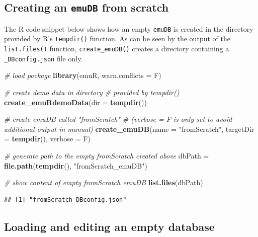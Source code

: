 \documentclass[]{book}
\newenvironment{Shaded}{\begin{snugshade}}{\end{snugshade}}
\newcommand{\CommentTok}[1]{\textcolor[rgb]{0.56,0.35,0.01}{\textit{#1}}}
\newcommand{\DataTypeTok}[1]{\textcolor[rgb]{0.13,0.29,0.53}{#1}}
\newcommand{\KeywordTok}[1]{\textcolor[rgb]{0.13,0.29,0.53}{\textbf{#1}}}
\newcommand{\NormalTok}[1]{#1}
\newcommand{\StringTok}[1]{\textcolor[rgb]{0.31,0.60,0.02}{#1}}
\begin{document}
\hypertarget{creating-an-emudb-from-scratch}{%
\subsection{\texorpdfstring{Creating an \texttt{emuDB} from scratch}{Creating an emuDB from scratch}}\label{creating-an-emudb-from-scratch}}

The R code snippet below shows how an empty \texttt{emuDB} is created in the directory provided by R's \texttt{tempdir()} function. As can be seen by the output of the \texttt{list.files()} function, \texttt{create\_emuDB()} creates a directory containing a \texttt{\_DBconfig.json} file only.

\begin{Shaded}
\begin{Highlighting}[]
\CommentTok{# load package}
\KeywordTok{library}\NormalTok{(emuR, }\DataTypeTok{warn.conflicts =}\NormalTok{ F)}

\CommentTok{# create demo data in directory }
\CommentTok{# provided by tempdir()}
\KeywordTok{create_emuRdemoData}\NormalTok{(}\DataTypeTok{dir =} \KeywordTok{tempdir}\NormalTok{())}

\CommentTok{# create emuDB called "fromScratch"}
\CommentTok{# (verbose = F is only set to avoid additional output in manual)}
\KeywordTok{create_emuDB}\NormalTok{(}\DataTypeTok{name =} \StringTok{"fromScratch"}\NormalTok{,}
             \DataTypeTok{targetDir =} \KeywordTok{tempdir}\NormalTok{(),}
             \DataTypeTok{verbose =}\NormalTok{ F)}

\CommentTok{# generate path to the empty fromScratch created above}
\NormalTok{dbPath =}\StringTok{ }\KeywordTok{file.path}\NormalTok{(}\KeywordTok{tempdir}\NormalTok{(), }\StringTok{"fromScratch_emuDB"}\NormalTok{)}

\CommentTok{# show content of empty fromScratch emuDB}
\KeywordTok{list.files}\NormalTok{(dbPath)}
\end{Highlighting}
\end{Shaded}

\begin{verbatim}
## [1] "fromScratch_DBconfig.json"
\end{verbatim}

\hypertarget{loading-and-editing-an-empty-database}{%
\subsection{Loading and editing an empty database}\label{loading-and-editing-an-empty-database}}
\end{document}
